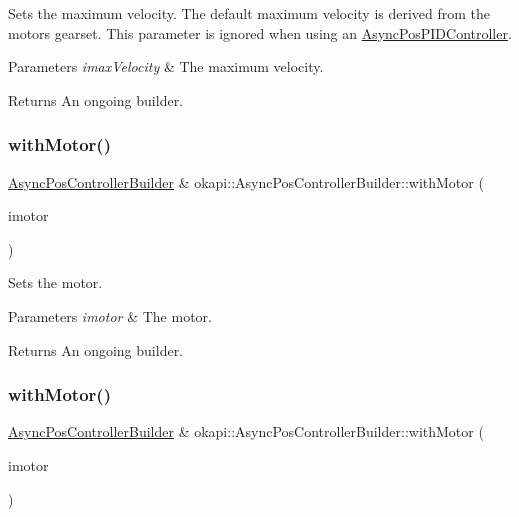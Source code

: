 Sets the maximum velocity. The default maximum velocity is derived from the motor\textquotesingle{}s gearset. This parameter is ignored when using an \mbox{\hyperlink{classokapi_1_1AsyncPosPIDController}{Async\+Pos\+P\+I\+D\+Controller}}.


\begin{DoxyParams}{Parameters}
{\em imax\+Velocity} & The maximum velocity. \\
\hline
\end{DoxyParams}
\begin{DoxyReturn}{Returns}
An ongoing builder. 
\end{DoxyReturn}
\mbox{\label{classokapi_1_1AsyncPosControllerBuilder_afe930ec31b591b6b2bf80be12bba3d79}} 
\subsubsection{\texorpdfstring{withMotor()}{withMotor()}\hspace{0.1cm}{\footnotesize\ttfamily [1/3]}}
{\footnotesize\ttfamily \mbox{\hyperlink{classokapi_1_1AsyncPosControllerBuilder}{Async\+Pos\+Controller\+Builder}} \& okapi\+::\+Async\+Pos\+Controller\+Builder\+::with\+Motor (\begin{DoxyParamCaption}\item[{const \mbox{\hyperlink{classokapi_1_1Motor}{Motor}} \&}]{imotor }\end{DoxyParamCaption})}

Sets the motor.


\begin{DoxyParams}{Parameters}
{\em imotor} & The motor. \\
\hline
\end{DoxyParams}
\begin{DoxyReturn}{Returns}
An ongoing builder. 
\end{DoxyReturn}
\mbox{\label{classokapi_1_1AsyncPosControllerBuilder_aa93b974218c68cdd213274446a7fe4c4}} 
\subsubsection{\texorpdfstring{withMotor()}{withMotor()}\hspace{0.1cm}{\footnotesize\ttfamily [2/3]}}
{\footnotesize\ttfamily \mbox{\hyperlink{classokapi_1_1AsyncPosControllerBuilder}{Async\+Pos\+Controller\+Builder}} \& okapi\+::\+Async\+Pos\+Controller\+Builder\+::with\+Motor (\begin{DoxyParamCaption}\item[{const \mbox{\hyperlink{classokapi_1_1MotorGroup}{Motor\+Group}} \&}]{imotor }\end{DoxyParamCaption})}

